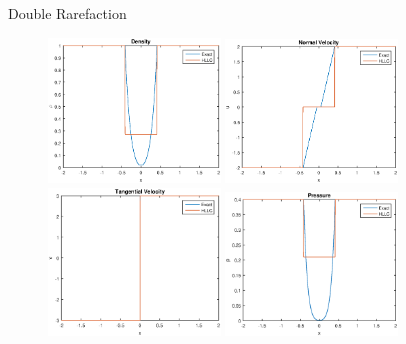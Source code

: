\documentclass{beamer}
\begin{document}
\begin{frame}{Double Rarefaction}
\begin{figure}[ht]
\centering
\includegraphics[width=1.8in]{dubRareDen}
\includegraphics[width=1.8in]{dubRareU}\\
\includegraphics[width=1.8in]{dubRareV}
\includegraphics[width=1.8in]{dubRareP}
\end{figure}
\end{frame}
\end{document}
